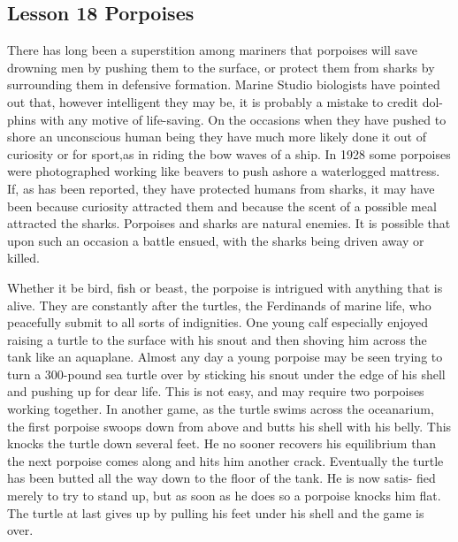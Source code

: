 \documentclass[kindlepaper]{BHCexam4kindle}
\begin{document}
\subsection{Lesson 18
Porpoises}
\par
There has long been a superstition among mariners that porpoises will save
drowning men by pushing them to the surface, or protect them from sharks by
surrounding them in defensive formation. Marine Studio biologists have pointed
out that, however intelligent they may be, it is probably a mistake to credit dol-
phins with any motive of life-saving. On the occasions when they have pushed to
shore an unconscious human being they have much more likely done it out of
curiosity or for sport,as in riding the bow waves of a ship. In 1928 some porpoises
were photographed working like beavers to push ashore a waterlogged mattress.
If, as has been reported, they have protected humans from sharks, it may have
been because curiosity attracted them and because the scent of a possible meal
attracted the sharks. Porpoises and sharks are natural enemies. It is possible
that upon such an occasion a battle ensued, with the sharks being driven away
or killed.
\par
Whether it be bird, fish or beast, the porpoise is intrigued with anything that
is alive. They are constantly after the turtles, the Ferdinands of marine life, who
peacefully submit to all sorts of indignities. One young calf especially enjoyed
raising a turtle to the surface with his snout and then shoving him across the
tank like an aquaplane. Almost any day a young porpoise may be seen trying
to turn a 300-pound sea turtle over by sticking his snout under the edge of his
shell and pushing up for dear life. This is not easy, and may require two porpoises
working together. In another game, as the turtle swims across the oceanarium,
the first porpoise swoops down from above and butts his shell with his belly.
This knocks the turtle down several feet. He no sooner recovers his equilibrium
than the next porpoise comes along and hits him another crack. Eventually the
turtle has been butted all the way down to the floor of the tank. He is now satis-
fied merely to try to stand up, but as soon as he does so a porpoise knocks him
flat. The turtle at last gives up by pulling his feet under his shell and the game
is over.
\clearpage
\end{document}
